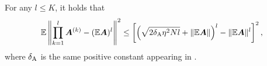 \begin{lemma} \label{lem:shuffle-poly-A-EA-expectation-l2}
    For any $l \leq K$, it holds that
    \[
    \mathbb{E}\left\|\prod_{k=1}^l{\bm{A}}^{(k)} - (\mathbb{E}{\bm{A}})^l \right\|^2 
    \leq \left[\left(\sqrt{2\delta_{\mathrm{A}}\eta^2N l} + \|\mathbb{E}{\bm{A}}\|\right)^l - \|\mathbb{E}{\bm{A}}\|^l\right]^2,
    \]
    where $\delta_{\mathrm{A}}$ is the same positive constant appearing in .
\end{lemma}
